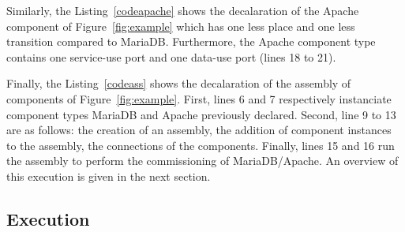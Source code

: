 Similarly, the Listing~\ref{codeapache} shows the decalaration of the
Apache component of Figure~\ref{fig:example} which has one less place
and one less transition compared to MariaDB. Furthermore, the Apache
component type contains one service-use port and one data-use port
(lines 18 to 21).



Finally, the Listing~\ref{codeass} shows the decalaration of the
assembly of components of Figure~\ref{fig:example}. First, lines 6 and
7 respectively instanciate component types MariaDB and Apache
previously declared. Second, line 9 to 13 are as follows: the creation
of an assembly, the addition of component instances to the assembly,
the connections of the components. Finally, lines 15 and 16 run the
assembly to perform the commissioning of MariaDB/Apache. An overview
of this execution is given in the next section.



\subsection{Execution}

